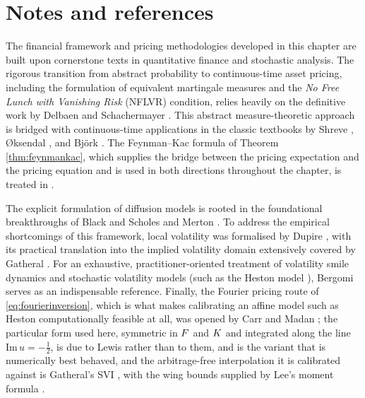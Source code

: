 
\section*{Notes and references}

\noindent
The financial framework and pricing methodologies developed in this chapter are built upon cornerstone texts in quantitative finance and stochastic analysis. The rigorous transition from abstract probability to continuous-time asset pricing, including the formulation of equivalent martingale measures and the \textit{No Free Lunch with Vanishing Risk} (NFLVR) condition, relies heavily on the definitive work by Delbaen and Schachermayer \cite{delbaenschachermayer1994}. This abstract measure-theoretic approach is bridged with continuous-time applications in the classic textbooks by Shreve \cite{shreve2004}, Øksendal \cite{oksendal2003}, and Björk \cite{bjork2009}. The Feynman--Kac formula of Theorem \ref{thm:feynmankac}, which supplies the bridge between the pricing expectation and the pricing equation and is used in both directions throughout the chapter, is treated in \cite[Sec.\ 4.4 and 5.7]{karatzasshreve1991}.

The explicit formulation of diffusion models is rooted in the foundational breakthroughs of Black and Scholes \cite{blackscholes1973} and Merton \cite{merton1973}. To address the empirical shortcomings of this framework, local volatility was formalised by Dupire \cite{dupire1994}, with its practical translation into the implied volatility domain extensively covered by Gatheral \cite{gatheral2006}. For an exhaustive, practitioner-oriented treatment of volatility smile dynamics and stochastic volatility models (such as the Heston model \cite{heston1993}), Bergomi \cite{bergomi2016} serves as an indispensable reference. Finally, the Fourier pricing route of \eqref{eq:fourierinversion}, which is what makes calibrating an affine model such as Heston computationally feasible at all, was opened by Carr and Madan \cite{carrmadan1999}; the particular form used here, symmetric in $F$ and $K$ and integrated along the line $\mathrm{Im}\,u = -\tfrac12$, is due to Lewis \cite{lewis2001} rather than to them, and is the variant that is numerically best behaved, and the arbitrage-free interpolation it is calibrated against is Gatheral's SVI \cite{gatheral2014}, with the wing bounds supplied by Lee's moment formula \cite{lee2004}.
